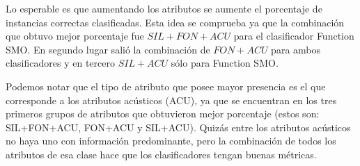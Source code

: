 Lo esperable es que aumentando los atributos se aumente el porcentaje de instancias correctas clasificadas. Esta idea se comprueba ya que la combinación que obtuvo mejor porcentaje fue $SIL+FON+ACU$ para el clasificador Function SMO. En segundo lugar salió la combinación de $FON+ACU$ para ambos clasificadores y en tercero $SIL+ACU$ sólo para Function SMO. 

Podemos notar que el tipo de atributo que posee mayor presencia es el que corresponde a los atributos acústicos (ACU), ya que se encuentran en los tres primeros grupos de atributos que obtuvieron mejor porcentaje (estos son: SIL+FON+ACU, FON+ACU y SIL+ACU). Quizás entre los atributos acústicos no haya uno con información predominante, pero la combinación de todos los atributos de esa clase hace que los clasificadores tengan buenas métricas.